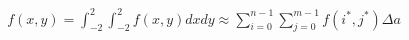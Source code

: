 \documentclass[preview]{standalone}
\begin{document}
\begin{align*}
f(x,y)  =  \int_{-2}^2 \int_{-2}^2 f(x,y) dx dy \approx \sum_{i=0}^{n-1} \sum_{j=0}^{m-1} f(i^*,j^*) \Delta a
\end{align*}
\end{document}
